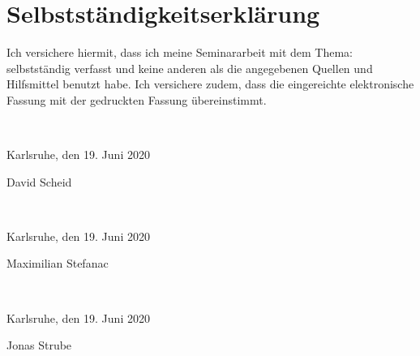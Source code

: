 
\section*{Selbstständigkeitserklärung}

Ich versichere hiermit, dass ich meine Seminararbeit mit dem Thema: \textquote{\mytitle} selbstständig verfasst und keine anderen als die angegebenen Quellen und Hilfsmittel benutzt habe. Ich versichere zudem, dass die eingereichte elektronische Fassung mit der gedruckten Fassung übereinstimmt.

\mbox{}\vspace{4\baselineskip}\\

\parbox{7cm}{\centering Karlsruhe, den 19. Juni 2020
}
\hfill
\parbox{4cm}{
	\strut \centering David Scheid}

\mbox{}\vspace{4\baselineskip}\\

\parbox{7cm}{\centering Karlsruhe, den 19. Juni 2020
}
\hfill
\parbox{4cm}{
	\strut \centering Maximilian Stefanac}

\mbox{}\vspace{4\baselineskip}\\

\parbox{7cm}{\centering Karlsruhe, den 19. Juni 2020
}
\hfill
\parbox{4cm}{
	\strut \centering Jonas Strube}
\clearpage%